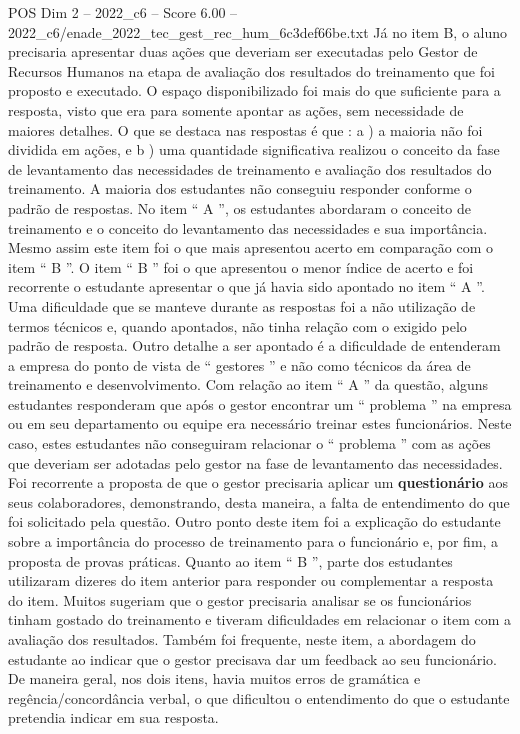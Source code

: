 \begin{textsample}{POS Dim 2 – 2022\_c6 – Score 6.00 – 2022\_c6/enade\_2022\_tec\_gest\_rec\_hum\_6c3def66be.txt}
Já no item B, o aluno precisaria apresentar duas ações que deveriam ser executadas pelo Gestor de Recursos Humanos na etapa de avaliação dos resultados do treinamento que foi proposto e executado.
O espaço disponibilizado foi mais do que suficiente para a resposta, visto que era para somente apontar as ações, sem necessidade de maiores detalhes.
O que se destaca nas respostas é que : a ) a maioria não foi dividida em ações, e b ) uma quantidade significativa realizou o conceito da fase de levantamento das necessidades de treinamento e avaliação dos resultados do treinamento.
A maioria dos estudantes não conseguiu responder conforme o padrão de respostas.
No item “ A ”, os estudantes abordaram o conceito de treinamento e o conceito do levantamento das necessidades e sua importância.
Mesmo assim este item foi o que mais apresentou acerto em comparação com o item “ B ”.
O item “ B ” foi o que apresentou o menor índice de acerto e foi recorrente o estudante apresentar o que já havia sido apontado no item “ A ”.
Uma dificuldade que se manteve durante as respostas foi a não utilização de termos técnicos e, quando apontados, não tinha relação com o exigido pelo padrão de resposta.
Outro detalhe a ser apontado é a dificuldade de entenderam a empresa do ponto de vista de “ gestores ” e não como técnicos da área de treinamento e desenvolvimento.
Com relação ao item “ A ” da questão, alguns estudantes responderam que após o gestor encontrar um “ problema ” na empresa ou em seu departamento ou equipe era necessário treinar estes funcionários.
Neste caso, estes estudantes não conseguiram relacionar o “ problema ” com as ações que deveriam ser adotadas pelo gestor na fase de levantamento das necessidades.
Foi recorrente a proposta de que o gestor precisaria aplicar um \textbf{questionário} aos seus colaboradores, demonstrando, desta maneira, a falta de entendimento do que foi solicitado pela questão.
Outro ponto deste item foi a explicação do estudante sobre a importância do processo de treinamento para o funcionário e, por fim, a proposta de provas práticas.
Quanto ao item “ B ”, parte dos estudantes utilizaram dizeres do item anterior para responder ou complementar a resposta do item.
Muitos sugeriam que o gestor precisaria analisar se os funcionários tinham gostado do treinamento e tiveram dificuldades em relacionar o item com a avaliação dos resultados.
Também foi frequente, neste item, a abordagem do estudante ao indicar que o gestor precisava dar um feedback ao seu funcionário.
De maneira geral, nos dois itens, havia muitos erros de gramática e regência/concordância verbal, o que dificultou o entendimento do que o estudante pretendia indicar em sua resposta.

\end{textsample}
